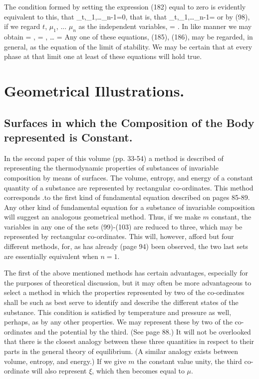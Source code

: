 \documentclass[12pt]{memoir}
\begin{document}
The condition formed by setting the expression (182) equal to zero is evidently equivalent to this, that
\eqs
{}_{t,\mu_1,\dots\mu_{n-1}}=0,\label{183}
\eqe
that is, that
\eqs
{}_{t,\mu_1,\dots\mu_{n-1}}=\infty \label{184}
\eqe
or by (98), if we regard $t$, $\mu_1$, ... $\mu_n$ as the independent variables,
\eqs {} = \infty.   \label{185}\eqe
In like manner we may obtain
\eqs {} = \infty,  = \infty, \dots {} = \infty \label{186}\eqe
Any one of these equations, (185), (186), may be regarded, in general, as the equation of the limit of stability. We may be certain that at every phase at that limit one at least of these equations will hold true.
\section{Geometrical Illustrations.}
\subsection{Surfaces in which the Composition of the Body represented is Constant.}
In the second paper of this volume (pp. 33-54) a method is described of representing the thermodynamic properties of substances of invariable composition by means of surfaces. The volume, entropy, and energy of a constant quantity of a substance are represented by rectangular co-ordinates.  This method corresponds .to the first kind of fundamental equation described on pages 85-89. Any other kind of fundamental equation for a substance of invariable composition will suggest an analogous geometrical method. Thus, if we make $m$ constant, the variables in any one of the sets (99)-(103) are reduced to three, which may be represented by rectangular co-ordinates. This will, however, afford but four different methods, for, as has already (page 94) been observed, the two last sets are essentially equivalent when $n= 1$.


The first of the above mentioned methods has certain advantages, especially for the purposes of theoretical discussion, but it may often be more advantageous to select a method in which the properties represented by two of the co-ordinates shall be such as best serve to identify and describe the different states of the substance. This condition is satisfied by temperature and pressure as well, perhaps, as by any other properties.  We may represent these by two of the co-ordinates and the potential by the third. (See page 88.) It will not be overlooked that there is the closest analogy between these three quantities in respect to their parts in the general theory of equilibrium. (A similar analogy exists between volume, entropy, and energy.) If we give $m$ the constant value unity, the third co-ordinate will also represent $\xi$, which then becomes equal to $\mu$.
\end{document}
